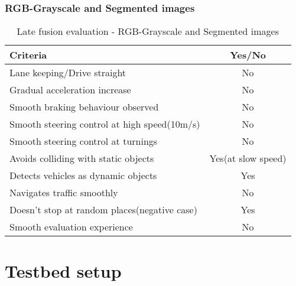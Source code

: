 \subsubsection*{RGB-Grayscale and Segmented images}
\begin{table}[!ht]
    \centering
\begin{tabular}{lc}
    \toprule
    Criteria  & Yes/No \\\midrule
    Lane keeping/Drive straight  & No  \\
    Gradual acceleration increase  & No\\
    Smooth braking behaviour observed & No \\
    Smooth steering control at high speed(10m/s) & No \\
    Smooth steering control at turnings & No\\
    Avoids colliding with static objects & Yes(at slow speed) \\
    Detects vehicles as dynamic objects & Yes \\
    Navigates traffic smoothly & No\\
    Doesn't stop at random places(negative case) & Yes \\
    Smooth evaluation experience & No \\\bottomrule
\end{tabular}
\caption{Late fusion evaluation - RGB-Grayscale and Segmented images}
\label{table:latefusionrgbseg}
\end{table}

\iffalse
\section{Testbed setup}

